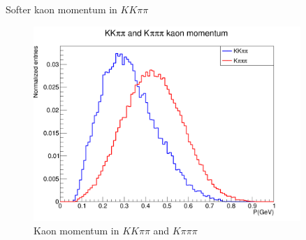 \documentclass{beamer}
\begin{document}
\begin{frame}{Softer kaon momentum in $KK\pi\pi$}
  \begin{figure}
    \centering
    \includegraphics[width=0.9\textwidth]{Plots/KaonMomentum.png}
    \caption{Kaon momentum in $KK\pi\pi$ and $K\pi\pi\pi$}
  \end{figure}
\end{frame}
\end{document}
